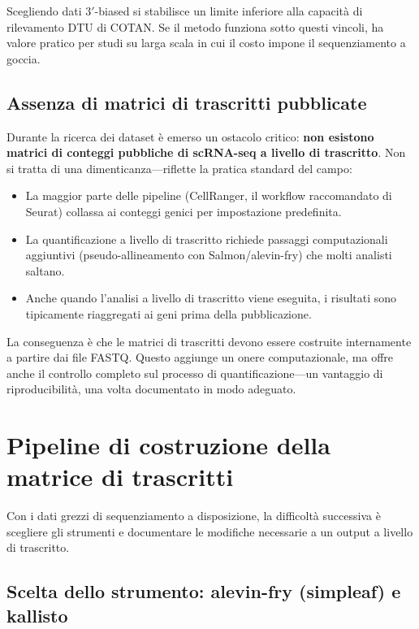 Scegliendo dati $3'$-biased si stabilisce un limite inferiore alla capacità di rilevamento DTU di COTAN. Se il metodo funziona sotto questi vincoli, ha valore pratico per studi su larga scala in cui il costo impone il sequenziamento a goccia.

\subsection*{Assenza di matrici di trascritti pubblicate}

Durante la ricerca dei dataset è emerso un ostacolo critico: \textbf{non esistono matrici di conteggi pubbliche di scRNA-seq a livello di trascritto}. Non si tratta di una dimenticanza---riflette la pratica standard del campo:
\begin{itemize}
    \item La maggior parte delle pipeline (CellRanger, il workflow raccomandato di Seurat) collassa ai conteggi genici per impostazione predefinita.
    \item La quantificazione a livello di trascritto richiede passaggi computazionali aggiuntivi (pseudo-allineamento con Salmon/alevin-fry) che molti analisti saltano.
    \item Anche quando l'analisi a livello di trascritto viene eseguita, i risultati sono tipicamente riaggregati ai geni prima della pubblicazione.
\end{itemize}

La conseguenza è che le matrici di trascritti devono essere costruite internamente a partire dai file FASTQ. Questo aggiunge un onere computazionale, ma offre anche il controllo completo sul processo di quantificazione---un vantaggio di riproducibilità, una volta documentato in modo adeguato.

\section{Pipeline di costruzione della matrice di trascritti}

Con i dati grezzi di sequenziamento a disposizione, la difficoltà successiva è scegliere gli strumenti e documentare le modifiche necessarie a un output a livello di trascritto.

\subsection*{Scelta dello strumento: alevin-fry (simpleaf) e kallisto}

